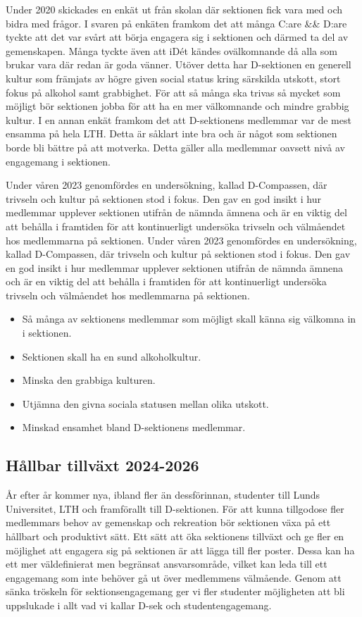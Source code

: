\documentclass[nopdfbookmarks,a4paper, 11pt, twoside]{article}
\begin{document}
Under 2020 skickades en enkät ut från skolan där sektionen fick vara med och bidra med frågor. I svaren på enkäten framkom det att många C:are \&\& D:are tyckte att det var svårt att börja engagera sig i sektionen och därmed ta del av gemenskapen. Många tyckte även att iDét kändes ovälkomnande då alla som brukar vara där redan är goda vänner. Utöver detta har D-sektionen en generell kultur som främjats av högre given social status kring särskilda utskott, stort fokus på alkohol samt grabbighet. För att så många ska trivas så mycket som möjligt bör sektionen jobba för att ha en mer välkomnande och mindre grabbig kultur. I en annan enkät framkom det att D-sektionens medlemmar var de mest ensamma på hela LTH. Detta är såklart inte bra och är något som sektionen borde bli bättre på att motverka. Detta gäller alla medlemmar oavsett nivå av engagemang i sektionen.

Under våren 2023 genomfördes en undersökning, kallad D-Compassen, där trivseln och kultur på sektionen stod i fokus. Den gav en god insikt i hur medlemmar upplever sektionen utifrån de nämnda ämnena och är en viktig del att behålla i framtiden för att kontinuerligt undersöka trivseln och välmåendet hos medlemmarna på sektionen. Under våren 2023 genomfördes en undersökning, kallad D-Compassen, där trivseln och kultur på sektionen stod i fokus. Den gav en god insikt i hur medlemmar upplever sektionen utifrån de nämnda ämnena och är en viktig del att behålla i framtiden för att kontinuerligt undersöka trivseln och välmåendet hos medlemmarna på sektionen.

\begin{itemize}
    \item Så många av sektionens medlemmar som möjligt skall känna sig välkomna in i sektionen.
    \item Sektionen skall ha en sund alkoholkultur.
    \item Minska den grabbiga kulturen.
    \item Utjämna den givna sociala statusen mellan olika utskott.
    \item Minskad ensamhet bland D-sektionens medlemmar.
\end{itemize}

\subsection{Hållbar tillväxt 2024-2026}
År efter år kommer nya, ibland fler än dessförinnan, studenter till Lunds Universitet, LTH och framförallt till D-sektionen. För att kunna tillgodose fler medlemmars behov av gemenskap och rekreation bör sektionen växa på ett hållbart och produktivt sätt. Ett sätt att öka sektionens tillväxt och ge fler en möjlighet att engagera sig på sektionen är att lägga till fler poster. Dessa kan ha ett mer väldefinierat men begränsat ansvarsområde, vilket kan leda till ett engagemang som inte behöver gå ut över medlemmens välmående. Genom att sänka tröskeln för sektionsengagemang ger vi fler studenter möjligheten att bli uppslukade i allt vad vi kallar D-sek och studentengagemang.
\end{document}
